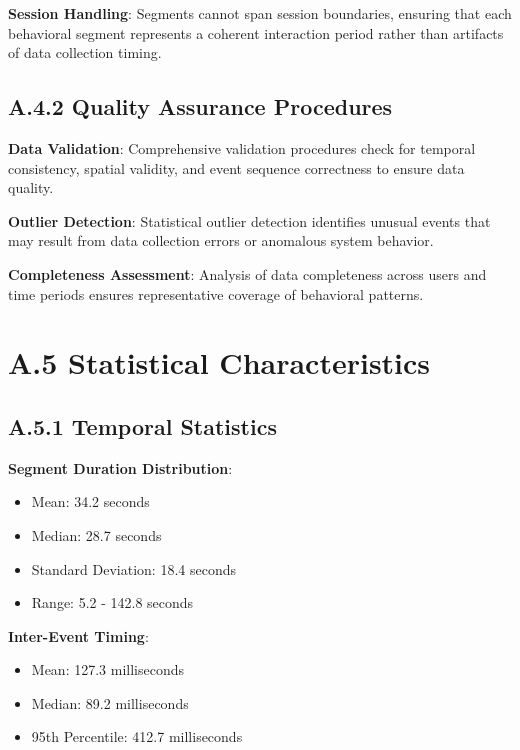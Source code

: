 \documentclass[
  12pt,
  a4paper,
]{report}
\providecommand{\tightlist}{%
  \setlength{\itemsep}{0pt}\setlength{\parskip}{0pt}}
\begin{document}
\textbf{Session Handling}: Segments cannot span session boundaries,
ensuring that each behavioral segment represents a coherent interaction
period rather than artifacts of data collection timing.

\subsection{A.4.2 Quality Assurance
Procedures}\label{a.4.2-quality-assurance-procedures}

\textbf{Data Validation}: Comprehensive validation procedures check for
temporal consistency, spatial validity, and event sequence correctness
to ensure data quality.

\textbf{Outlier Detection}: Statistical outlier detection identifies
unusual events that may result from data collection errors or anomalous
system behavior.

\textbf{Completeness Assessment}: Analysis of data completeness across
users and time periods ensures representative coverage of behavioral
patterns.

\section{A.5 Statistical
Characteristics}\label{a.5-statistical-characteristics}

\subsection{A.5.1 Temporal Statistics}\label{a.5.1-temporal-statistics}

\textbf{Segment Duration Distribution}:

\begin{itemize}
\tightlist
\item
  Mean: 34.2 seconds
\item
  Median: 28.7 seconds
\item
  Standard Deviation: 18.4 seconds
\item
  Range: 5.2 - 142.8 seconds
\end{itemize}

\textbf{Inter-Event Timing}:

\begin{itemize}
\tightlist
\item
  Mean: 127.3 milliseconds
\item
  Median: 89.2 milliseconds
\item
  95th Percentile: 412.7 milliseconds
\end{itemize}
\end{document}
